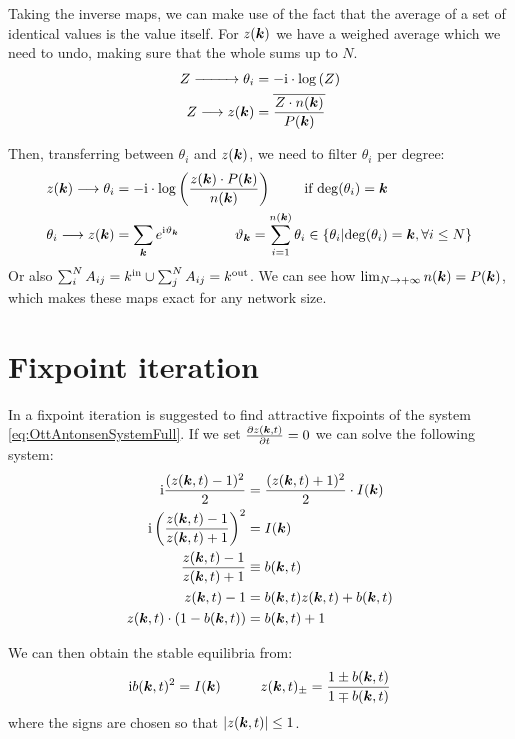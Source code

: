 Taking the inverse maps, we can make use of the fact that the average of a set of identical values is the value itself. For $z({\boldsymbol{k}})$ we have a weighed average which we need to undo, making sure that the whole sums up to $N$.
\begin{align*}
Z \xrightarrow{\hspace*{9mm}} \theta_{i} &= -{\rm{i}} \cdot \log \left( Z \right) \\
Z \longrightarrow z({\boldsymbol{k}}) &= \overline{\frac{Z \cdot n({\boldsymbol{k}})}{P({\boldsymbol{k}})}}
\end{align*}

Then, transferring between $\theta_i$ and $z({\boldsymbol{k}})$, we need to filter $\theta_i$ per degree:
\begin{align*}
z({\boldsymbol{k}}) \longrightarrow \theta_i &= -{\rm{i}} \cdot \log \left( \frac{z({\boldsymbol{k}})\cdot P({\boldsymbol{k}})}{n({\boldsymbol{k}})} \right) \qquad \text{ if } {\rm deg}(\theta_i) = {\boldsymbol{k}} \\
\theta_i \longrightarrow z({\boldsymbol{k}}) &= \sum_{{\boldsymbol{k}}} e^{{\rm{i}} \vartheta_{{\boldsymbol{k}}}} \qquad \qquad \vartheta_{{\boldsymbol{k}}} = \sum_{i = 1}^{n({\boldsymbol{k}})} \theta_i \in 
\left\{ \theta_i \vert {\rm deg}(\theta_i) = {\boldsymbol{k}}, \forall i \leq N \right\}
\end{align*}
Or also $\sum_i^N A_{ij} = k^{\rm in} \cup \sum_j^N A_{ij} = {k^{\rm out}}$. We can see how $\lim_{N \rightarrow +\infty} n({\boldsymbol{k}}) = P({\boldsymbol{k}})$, which makes these maps exact for any network size. 
    

\section{Fixpoint iteration}
In \cite{OttAntonsen2017} a fixpoint iteration is suggested to find attractive fixpoints of the system \eqref{eq:OttAntonsenSystemFull}. If we set $\frac{\partial z({\boldsymbol{k}}, t)}{\partial t} = 0$ we can solve the following system:
\begin{align}
{\rm{i}} \frac{(z({\boldsymbol{k}}, t)-1)^{2}}{2} &= \frac{(z({\boldsymbol{k}}, t)+1)^{2}}{2} \cdot I({\boldsymbol{k}}) \nonumber \\
{\rm{i}} \left(\frac{z({\boldsymbol{k}}, t)-1}{z({\boldsymbol{k}}, t)+1}\right)^2 &= I({\boldsymbol{k}}) \nonumber \\
\frac{z({\boldsymbol{k}}, t)-1}{z({\boldsymbol{k}}, t)+1} &\equiv b({\boldsymbol{k}},t) \nonumber \\
z({\boldsymbol{k}}, t) - 1 &= b({\boldsymbol{k}},t) z({\boldsymbol{k}}, t) + b({\boldsymbol{k}},t)  \nonumber \\
z({\boldsymbol{k}}, t) \cdot (1 - b({\boldsymbol{k}},t)) &= b({\boldsymbol{k}},t)  + 1\nonumber
\end{align}

We can then obtain the stable equilibria from:
\begin{align}
\ic b(\k,t)^2 = I(\k) \hspace{10mm} z(\k, t)_{\pm} = \frac{1 \pm b(\k,t)}{1 \mp b(\k,t)} \label{eq:fixedpointiterations} 
\end{align}
where the signs are chosen so that $\vert z({\boldsymbol{k}}, t) \vert \leq 1$.


